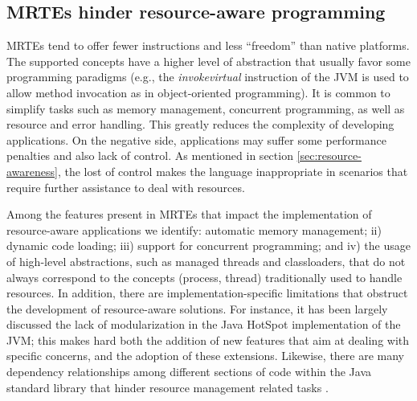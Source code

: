 \subsection{MRTEs hinder resource-aware programming}

MRTEs tend to offer fewer instructions and less ``freedom'' than native platforms.
The supported concepts have a higher level of abstraction that usually favor some programming paradigms (e.g., the \textit{invokevirtual} instruction of the JVM is used to allow method invocation as in object-oriented programming).
It is common to simplify tasks such as memory management, concurrent programming, as well as resource and error handling.
This greatly reduces the complexity of developing applications.
On the negative side, applications may suffer some performance penalties and also lack of control.
As mentioned in section \ref{sec:resource-awareness}, the lost of control makes the language inappropriate in scenarios that require further assistance to deal with resources.

Among the features present in MRTEs that impact the implementation of resource-aware applications we identify: automatic memory management; ii) dynamic code loading; iii) support for concurrent programming; and iv) the usage of high-level abstractions, such as managed threads and classloaders,  that do not always correspond to the concepts (process, thread) traditionally used to handle resources.
In addition, there are implementation-specific limitations that obstruct the development of resource-aware solutions.
For instance, it has been largely discussed \cite{Doyle2002,Fong:2004:PVM:1028976.1029010,1420998} the lack of modularization in the Java HotSpot implementation of the JVM; this makes hard both the addition of new features that aim at dealing with specific concerns, and the adoption of these extensions.
Likewise, there are many dependency relationships among different sections of code within the Java standard library that hinder resource management related tasks \cite{Blackburn2008,Kell:2012:JOE:2414740.2414747}.

%
%
%
%
%

